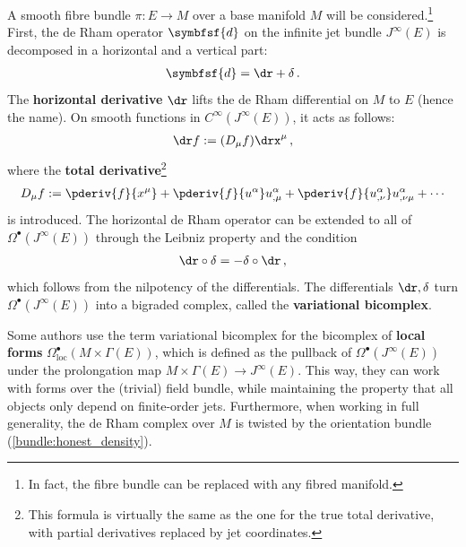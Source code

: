     A smooth fibre bundle $\pi:E\rightarrow M$ over a base manifold $M$ will be considered.\footnote{In fact, the fibre bundle can be replaced with any fibred manifold.} First, the de Rham operator $\symbfsf{d}$ on the infinite jet bundle $J^\infty(E)$ is decomposed in a horizontal and a vertical part:
    \begin{gather}
        \symbfsf{d} = \dr+\delta\,.
    \end{gather}
    The \textbf{horizontal derivative} $\dr$ lifts the de Rham differential on $M$ to $E$ (hence the name). On smooth functions in $C^\infty(J^\infty(E))$, it acts as follows:
    \begin{gather}
        \label{var:horizontal_derivative}
        \dr f := (D_\mu f)\drx^\mu\,,
    \end{gather}
    where the \textbf{total derivative}\footnote{This formula is virtually the same as the one for the true total derivative, with partial derivatives replaced by jet coordinates.}
    \begin{gather}
        D_\mu f := \pderiv{f}{x^\mu} + \pderiv{f}{u^\alpha}u^\alpha_{,\mu} + \pderiv{f}{u^\alpha_{,\nu}}u^\alpha_{,\nu\mu} + \cdots
    \end{gather}
    is introduced. The horizontal de Rham operator can be extended to all of $\Omega^\bullet(J^\infty(E))$ through the Leibniz property and the condition
    \begin{gather}
        \dr\circ\delta = -\delta\circ\dr\,,
    \end{gather}
    which follows from the nilpotency of the differentials. The differentials $\dr,\delta$ turn $\Omega^\bullet(J^\infty(E))$ into a bigraded complex, called the \textbf{variational bicomplex}.
    \begin{remark}
        Some authors use the term variational bicomplex for the bicomplex of \textbf{local forms} $\Omega^\bullet_\mathrm{loc}(M\times\Gamma(E))$, which is defined as the pullback of $\Omega^\bullet(J^\infty(E))$ under the prolongation map $M\times\Gamma(E)\rightarrow J^\infty(E)$. This way, they can work with forms over the (trivial) field bundle, while maintaining the property that all objects only depend on finite-order jets. Furthermore, when working in full generality, the de Rham complex over $M$ is twisted by the orientation bundle (\cref{bundle:honest_density}).
    \end{remark}

